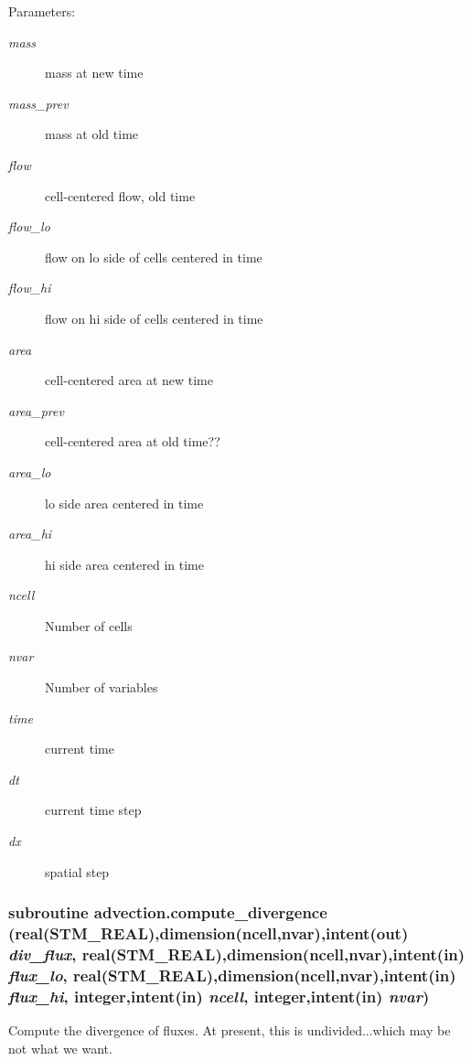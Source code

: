 \begin{Desc}
\item[Parameters:]
\begin{description}
\item[{\em mass}]mass at new time\item[{\em mass\_\-prev}]mass at old time\item[{\em flow}]cell-centered flow, old time\item[{\em flow\_\-lo}]flow on lo side of cells centered in time\item[{\em flow\_\-hi}]flow on hi side of cells centered in time\item[{\em area}]cell-centered area at new time\item[{\em area\_\-prev}]cell-centered area at old time??\item[{\em area\_\-lo}]lo side area centered in time\item[{\em area\_\-hi}]hi side area centered in time\item[{\em ncell}]Number of cells\item[{\em nvar}]Number of variables\item[{\em time}]current time\item[{\em dt}]current time step\item[{\em dx}]spatial step \end{description}
\end{Desc}
\hypertarget{a00026_aa34a3af6ce02dba4b6a11c1b38f51f0}{
\subsubsection[{compute\_\-divergence}]{\setlength{\rightskip}{0pt plus 5cm}subroutine advection.compute\_\-divergence (real(STM\_\-REAL),dimension(ncell,nvar),intent(out) {\em div\_\-flux}, \/  real(STM\_\-REAL),dimension(ncell,nvar),intent(in) {\em flux\_\-lo}, \/  real(STM\_\-REAL),dimension(ncell,nvar),intent(in) {\em flux\_\-hi}, \/  integer,intent(in) {\em ncell}, \/  integer,intent(in) {\em nvar})}}
\label{a00026_aa34a3af6ce02dba4b6a11c1b38f51f0}


Compute the divergence of fluxes. At present, this is undivided...which may be not what we want. 

